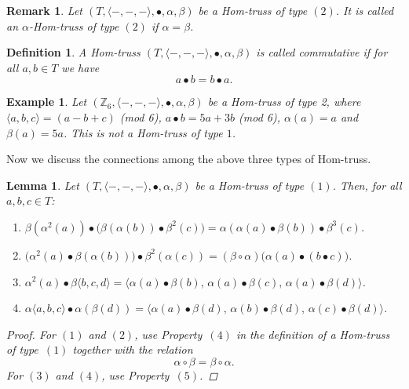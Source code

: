 \documentclass[14pt]{article}
\newtheorem{lemma}[thm]{Lemma}
\theoremstyle{Definition}
\newtheorem{Def}[thm]{Definition}
\newtheorem{Rem}[thm]{Remark}
\newtheorem{Exam}[thm]{Example}
\theoremstyle{remark}
\begin{document}
 \begin{Rem} 
Let $(T, \langle -,-,- \rangle, \bullet, \alpha, \beta)$ be a Hom-truss of type $(2)$.  
It is called an \emph{$\alpha$-Hom-truss of type $(2)$} if $\alpha = \beta$.
\end{Rem} 

\begin{Def}
A Hom-truss $(T, \langle -,-,- \rangle, \bullet, \alpha, \beta)$ is called \emph{commutative} if for all $a, b \in T$ we have  
\[
a \bullet b = b \bullet a.
\]
\end{Def}
\begin{Exam}
Let $(\mathbb{Z}_{6},\langle-,-,-\rangle,\bullet,\alpha,\beta)$ be a Hom-truss of type 2, where $\langle a,b,c\rangle=(a-b+c)$ (mod 6), $a\bullet b=5a+3b$ (mod 6), $\alpha(a)=a$ and $\beta(a)=5a$. This is not a Hom-truss of type $1$.
\end{Exam}

Now we discuss the connections among the above three types of Hom-truss.

\begin{lemma}
Let $(T, \langle -,-,- \rangle, \bullet, \alpha, \beta)$ be a Hom-truss of type $(1)$. Then, for all $a, b, c \in T$:
\begin{enumerate}
\item $\beta(\alpha^{2}(a)) \bullet \big( \beta(\alpha(b)) \bullet \beta^{2}(c) \big) = \alpha(\alpha(a) \bullet \beta(b)) \bullet \beta^{3}(c)$.
\item $\big( \alpha^{2}(a) \bullet \beta(\alpha(b)) \big) \bullet \beta^{2}(\alpha(c)) = (\beta \circ \alpha) \big( \alpha(a) \bullet (b \bullet c) \big)$.
\item $\alpha^{2}(a) \bullet \beta\langle b, c, d \rangle = \langle \alpha(a) \bullet \beta(b), \, \alpha(a) \bullet \beta(c), \, \alpha(a) \bullet \beta(d) \rangle$.
\item $\alpha\langle a, b, c \rangle \bullet \alpha(\beta(d)) = \langle \alpha(a) \bullet \beta(d), \, \alpha(b) \bullet \beta(d), \, \alpha(c) \bullet \beta(d) \rangle$.
\end{enumerate}
\begin{proof}
For $(1)$ and $(2)$, use Property~$(4)$ in the definition of a Hom-truss of type~$(1)$ together with the relation
\[
\alpha\circ\beta=\beta\circ\alpha.
\]
For $(3)$ and $(4)$, use Property~$(5)$.
\end{proof}
\end{lemma}
\end{document}
